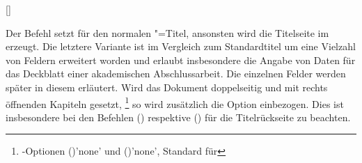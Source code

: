 \begin{Declaration*}{}
\begin{Declaration*}{}
\begin{Declaration*}{}
\begin{Declaration}{[]}
\begin{Declaration}[v2.02]{%
}
\begin{Declaration}[v2.06]{}{%
}
\begin{Declaration}[v2.02]{}{%
}
\begin{Declaration}[v2.03]{}{%
}
\begin{Declaration}[v2.03]{}{%
}
\begin{Declaration}[v2.03]{%
}{}
\begin{Declaration}[v2.03]{%
}{}
\begin{Declaration}[v2.03]{}{%
}
\begin{Declaration}[v2.03]{}{%
}
\begin{Declaration}[v2.03]{}{%
}
\printdeclarationlist%
%
%
%
Der Befehl  setzt für  den normalen 
\KOMAScript"=Titel{}, ansonsten wird die Titelseite im \TUDCD erzeugt. Die 
letztere Variante ist im Vergleich zum Standardtitel um eine Vielzahl von 
Feldern erweitert worden und erlaubt insbesondere die Angabe von Daten für das 
Deckblatt einer akademischen Abschlussarbeit. Die einzelnen Felder werden 
später in diesem \autorefname erläutert. Wird das Dokument doppelseitig und mit 
rechts öffnenden Kapiteln gesetzt,%
\footnote{%
  \KOMAScript-Optionen ()'none' und 
  ()'none', Standard für 
}
so wird zusätzlich die Option  einbezogen. Dies 
ist insbesondere bei den Befehlen () 
respektive () für die Titelrückseite 
zu beachten.


\end{Declaration}
\end{Declaration}
\end{Declaration}
\end{Declaration}
\end{Declaration}
\end{Declaration}
\end{Declaration}
\end{Declaration}
\end{Declaration}
\end{Declaration}
\end{Declaration}
\end{Declaration*}
\end{Declaration*}
\end{Declaration*}
